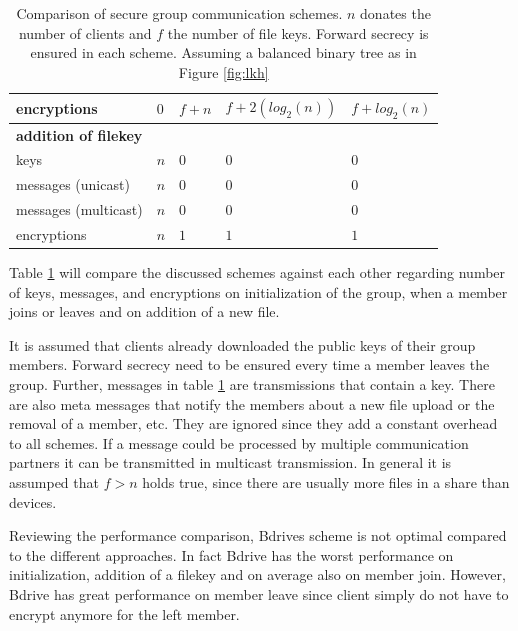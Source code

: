 \begin{table}[!ht]
\begin{tabular}{l 		| l 						| l 							| l 						| l 						}
encryptions 			& $0$						& $f + n$ 						& $f + 2 (log_2(n))$ 		& $f + log_2(n)$	 		\\ %
\hline	
\textbf{addition of filekey}																																\\
keys 					& $n$		 				& $0$							& $0$	 					& $0$		 				\\ %
messages (unicast)		& $n$		 				& $0$	 						& $0$ 						& $0$		 				\\ %
messages (multicast)	& $n$ 						& $0$ 							& $0$ 						& $0$	 					\\ %
encryptions				& $n$ 						& $1$ 							& $1$ 						& $1$		 				\\ %
\hline
\end{tabular}
\caption{Comparison of secure group communication schemes. $n$ donates the number of clients and $f$ the number of file keys. Forward secrecy is ensured in each scheme. Assuming a balanced binary tree as in Figure \ref{fig:lkh}}
\label{tab:comparisons}
\end{table}

Table \ref{tab:comparisons} will compare the discussed schemes against each other regarding number of keys, messages, and encryptions on initialization of the group, when a member joins or leaves and on addition of a new file. 

It is assumed that clients already downloaded the public keys of their group members. Forward secrecy need to be ensured every time a member leaves the group.
Further, messages in table \ref{tab:comparisons} are transmissions that contain a key. There are also meta messages that notify the members about a new file upload or the removal of a member, etc.  They are ignored since they add a constant overhead to all schemes.  If a message could be processed by multiple communication partners it can be transmitted in multicast transmission. In general it is assumped that $f > n$ holds true, since there are usually more files in a share than devices.

Reviewing the performance comparison, Bdrives scheme is not optimal compared to the different approaches. In fact Bdrive has the worst performance on initialization, addition of a filekey and on average also on member join. However, Bdrive has great performance on member leave since client simply do not have to encrypt anymore for the left member.

